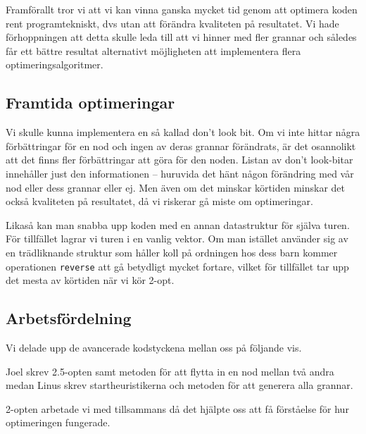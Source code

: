 \documentclass[a4paper,12pt]{article}
\renewcommand{\*}{\ensuremath{\cdot}}
\begin{document}
Framförallt tror vi att vi kan vinna ganska mycket tid genom att optimera koden rent programtekniskt, dvs utan att förändra kvaliteten på resultatet. Vi hade förhoppningen att detta skulle leda till att vi hinner med fler grannar och således får ett bättre resultat alternativt möjligheten att implementera flera optimeringsalgoritmer.

\subsection{Framtida optimeringar} 

Vi skulle kunna implementera en så kallad don't look bit. Om vi inte hittar
några förbättringar för en nod och ingen av deras grannar förändrats, är det
osannolikt att det finns fler förbättringar att göra för den noden. Listan av
don't look-bitar innehåller just den informationen -- huruvida det hänt någon
förändring med vår nod eller dess grannar eller ej. Men även om det minskar
körtiden minskar det också kvaliteten på resultatet, då vi riskerar gå miste om
optimeringar.

Likaså kan man snabba upp koden med en annan datastruktur för själva turen. För
tillfället lagrar vi turen i en vanlig vektor. Om man istället använder sig av
en trädliknande struktur som håller koll på ordningen hos dess barn kommer
operationen \texttt{reverse} att gå betydligt mycket fortare, vilket för
tillfället tar upp det mesta av körtiden när vi kör 2-opt.

\subsection{Arbetsfördelning}

Vi delade upp de avancerade kodstyckena mellan oss på följande vis.

Joel skrev 2.5-opten samt metoden för att flytta in en nod mellan två andra
medan Linus skrev startheuristikerna och metoden för att generera alla grannar.

2-opten arbetade vi med tillsammans då det hjälpte oss att få förståelse för hur
optimeringen fungerade.
\end{document}
